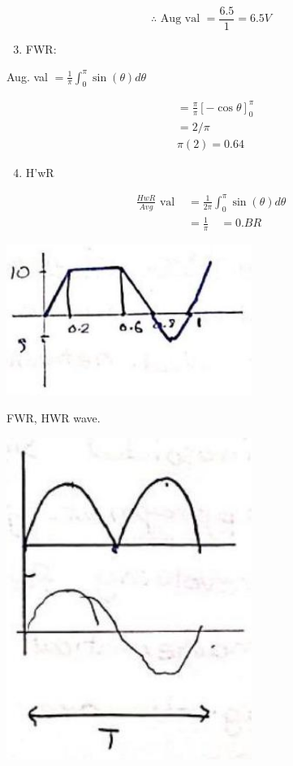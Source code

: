 \documentclass[12pt, a4paper]{article}
\newcommand{\figwidth}{8cm}
\begin{document}
	$$
		\therefore \text { Aug val }=\frac{6.5}{1}=6.5 V
	$$

	\begin{enumerate}
		\setcounter{enumi}{2}
		\item FWR:
	\end{enumerate}

	Aug. val $=\frac{1}{\pi} \int_{0}^{\pi} \sin (\theta) d \theta$

	$$
		\begin{aligned}
			 & =\frac{\pi}{\pi}[-\cos \theta]_{0}^{\pi} \\
			 & =2 / \pi                                 \\
			 & \pi(2)=0.64
		\end{aligned}
	$$

	\begin{enumerate}
		\setcounter{enumi}{3}
		\item H'wR
	\end{enumerate}

	$$
		\begin{aligned}
			\frac{H w R}{A v g} \text { val } & =\frac{1}{2 \pi} \int_{0}^{\pi} \sin (\theta) d \theta \\
			                                  & =\frac{1}{\pi} \quad=0 . B R
		\end{aligned}
	$$

	\begin{center}
		\includegraphics[max width=\figwidth]{2024_06_15_74bbabba7981675b0d49g-01(4)}
	\end{center}

	FWR, HWR wave.

	\begin{center}
		\includegraphics[max width=\figwidth]{2024_06_15_74bbabba7981675b0d49g-01(3)}
	\end{center}
\end{document}

